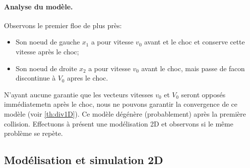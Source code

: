 \paragraph{Analyse du modèle.} Observons le premier floe de plus près:
\begin{itemize}
    \item Son noeud de gauche $x_1$ a pour vitesse $v_0$ avant et le choc et conserve cette vitesse après le choc;
    \item Son noeud de droite $x_2$ a pour vitesse $v_0$ avant le choc, mais passe de facon discontinue à $V_0$ apres le choc.
\end{itemize}
N'ayant aucune garantie que les vecteurs vitesses $v_0$ et $V_0$ seront opposés immédiatemetn après le choc, nous ne pouvons garantir la convergence de ce modèle (voir \cref{th:div1D}). Ce modèle dégénère (probablement) après la première collision. Effectuons à présent une modélisation 2D et observons si le même problème se repète.








\subsection{Modélisation et simulation 2D}









